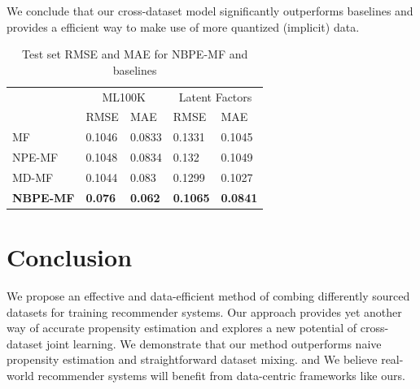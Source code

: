 \documentclass{article}
\begin{document}
We conclude that our cross-dataset model significantly outperforms baselines and provides a efficient way to make use of more quantized (implicit) data. 

\begin{table}
  \caption{Test set RMSE and MAE for NBPE-MF and baselines}
  \label{sample-table}
  \centering
  \begin{tabular}{lllll}
    \toprule               
                     & \multicolumn{2}{c}{ML100K} & \multicolumn{2}{c}{Latent Factors}                                     \\
    \cmidrule(r){2-5}
                     & RMSE                       & MAE                                & RMSE            & MAE             \\
    \midrule
    MF               & 0.1046                     & 0.0833                             & 0.1331          & 0.1045          \\ 
    NPE-MF           & 0.1048                     & 0.0834                             & 0.132           & 0.1049          \\ 
    MD-MF            & 0.1044                     & 0.083                              & 0.1299          & 0.1027          \\
    \textbf{NBPE-MF} & \textbf{0.076}             & \textbf{0.062}                     & \textbf{0.1065} & \textbf{0.0841} \\ 
    \bottomrule
  \end{tabular}
\end{table}

\section{Conclusion}
We propose an effective and data-efficient method of combing differently sourced datasets for training recommender systems. Our approach provides yet another way of accurate propensity estimation and explores a new potential of cross-dataset joint learning. We demonstrate that our method outperforms naive propensity estimation and straightforward dataset mixing. and  We believe real-world recommender systems will benefit from data-centric frameworks like ours.




\end{document}
